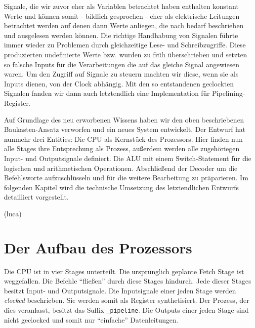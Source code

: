 \documentclass[paper=a4,fontsize=12pt,twocolumn]{scrreprt}
\begin{document}
Signale, die wir zuvor eher als Variablen betrachtet haben enthalten konstant Werte und können somit - bildlich gesprochen - eher als elektrische Leitungen betrachtet werden auf denen dann Werte anliegen, die nach bedarf beschrieben und ausgelesen werden können.
Die richtige Handhabung von Signalen führte immer wieder zu Problemen durch gleichzeitige Lese- und Schreibzugriffe.
Diese produzierten undefinierte Werte bzw. wurden zu früh überschrieben und setzten so falsche Inputs für die Verarbeitungen die auf das gleiche Signal angewiesen waren.
Um den Zugriff auf Signale zu steuern machten wir diese, wenn sie als Inputs dienen, von der Clock abhängig.
Mit den so entstandenen geclockten Signalen fanden wir dann auch letztendlich eine Implementation für Pipelining-Register.

Auf Grundlage des neu erworbenen Wissens haben wir den oben beschriebenen Baukasten-Ansatz verworfen und ein neues System entwickelt. 
Der Entwurf hat nunmehr drei Entities: Die CPU als Kernstück des Prozessors.
Hier finden nun alle Stages ihre Entsprechung als Prozess, außerdem werden alle zugehöriegen Input- und Outputsignale definiert.
Die ALU mit einem Switch-Statement für die logischen und arithmetischen Operationen.
Abschließend der Decoder um die Befehlsworte aufzuschlüsseln und für die weitere Bearbeitung zu präparieren.
Im folgenden Kapitel wird die technische Umsetzung des letztendlichen Entwurfs detailliert vorgestellt.

(luca)

\section{Der Aufbau des Prozessors}
\label{sec:aufbau_des_prozessors}

Die CPU ist in vier Stages unterteilt.
Die ursprünglich geplante Fetch Stage ist weggefallen.
Die Befehle \enquote{fließen} durch diese Stages hindurch.
Jede dieser Stages besitzt Input- und Outputsignale.
Die Inputsignale einer jeden Stage werden \textit{clocked} beschrieben.
Sie werden somit als Register synthetisiert.
Der Prozess, der dies veranlasst, besitzt das Suffix \texttt{\_pipeline}.
Die Outputs einer jeden Stage sind nicht geclocked und somit nur \enquote{einfache} Datenleitungen.
\end{document}
